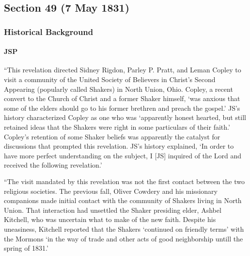\subsection{Section 49 (7 May 1831)}
	\label{DC49}
	
	\subsubsection{Historical Background}
		\label{DC49-HB}
		
		\paragraph{JSP}
		
			``This revelation directed Sidney Rigdon, Parley P. Pratt, and Leman Copley to visit a community of the United Society of Believers in Christ's Second Appearing (popularly called Shakers) in North Union, Ohio. Copley, a recent convert to the Church of Christ and a former Shaker himself, `was anxious that some of the elders should go to his former brethren and preach the gospel.' JS's history characterized Copley as one who was `apparently honest hearted, but still retained ideas that the Shakers were right in some particulars of their faith.' Copley's retention of some Shaker beliefs was apparently the catalyst for discussions that prompted this revelation. JS's history explained, `In order to have more perfect understanding on the subject, I [JS] inquired of the Lord and received the following revelation.'
			
			``The visit mandated by this revelation was not the first contact between the two religious societies. The previous fall, Oliver Cowdery and his missionary companions made initial contact with the community of Shakers living in North Union. That interaction had unsettled the Shaker presiding elder, Ashbel Kitchell, who was uncertain what to make of the new faith. Despite his uneasiness, Kitchell reported that the Shakers `continued on friendly terms' with the Mormons `in the way of trade and other acts of good neighborship untill the spring of 1831.'
			
